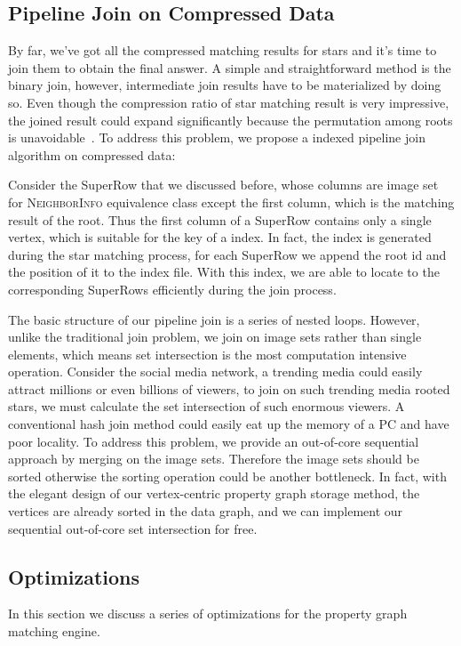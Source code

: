 \subsection{Pipeline Join on Compressed Data}\label{sec:match_join}
By far, we've got all the compressed matching results for stars and it's time to join them to obtain the final answer.
A simple and straightforward method is the binary join, however, intermediate join results have to be materialized by doing so.
Even though the compression ratio of star matching result is very impressive,
the joined result could expand significantly because the permutation among roots is unavoidable~\cite{DBLP:journals/pvldb/SunWWSL12}.
To address this problem, we propose a indexed pipeline join algorithm on compressed data:

Consider the SuperRow that we discussed before, whose columns are image set for \textsc{NeighborInfo} equivalence class except the first column, which is the matching result of the root.
Thus the first column of a SuperRow contains only a single vertex, which is suitable for the key of a index.
In fact, the index is generated during the star matching process,
for each SuperRow we append the root id and the position of it to the index file.
With this index, we are able to locate to the corresponding SuperRows efficiently during the join process.

The basic structure of our pipeline join is a series of nested loops.
However, unlike the traditional join problem, we join on image sets rather than single elements,
which means set intersection is the most computation intensive operation.
Consider the social media network, a trending media could easily attract millions or even billions of viewers,
to join on such trending media rooted stars, we must calculate the set intersection of such enormous viewers.
A conventional hash join method could easily eat up the memory of a PC and have poor locality.
To address this problem, we provide an out-of-core sequential approach by merging on the image sets.
Therefore the image sets should be sorted otherwise the sorting operation could be another bottleneck.
In fact, with the elegant design of our vertex-centric property graph storage method,
the vertices are already sorted in the data graph, and we can implement our sequential out-of-core set intersection for free.
\subsection{Optimizations}\label{sec:match_optimize}
In this section we discuss a series of optimizations for the property graph matching engine.
